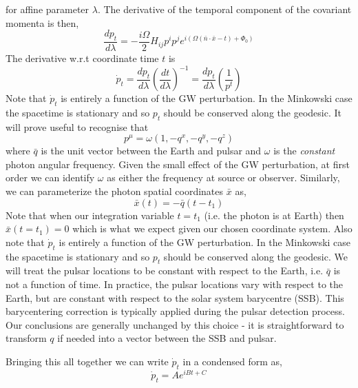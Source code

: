 \documentclass[fleqn,usenatbib,useAMS]{mnras}
\begin{document}
\noindent for affine parameter $\lambda$. The derivative of the temporal component of the covariant momenta is then,
\begin{equation}
	\frac{d p_{t}}{d \lambda} = -\frac{i\Omega}{2} H_{ij}p^i p^j  e^{i(\Omega(\bar{n}\cdot \bar{x} - t)+\Phi_0)}
\end{equation}
\noindent The derivative w.r.t coordinate time $t$ is
\begin{equation}
	\dot{p}_t = \frac{d p_{t}}{d \lambda} \left(\frac{dt}{d\lambda}\right)^{-1} = \frac{d p_{t}}{d \lambda} \left(\frac{1}{p^t}\right)
\end{equation}
\noindent Note that $\dot{p}_t$ is entirely a function of the GW perturbation. In the Minkowski case the spacetime is stationary and so $p_t$ should be conserved along the geodesic. 
It will prove useful to recognise that 
\begin{equation}
	p^{\mu} = \omega(1,-q^x,-q^y,-q^z)
\end{equation} 
where $\bar{q}$ is the unit vector between the Earth and pulsar and $\omega$ is the \textit{constant} photon angular frequency. Given the small effect of the GW perturbation, at first order we can identify $\omega$ as either the frequency at source or observer. Similarly, we can parameterize the photon spatial coordinates $\bar{x}$ as,
\begin{equation}
	\bar{x}(t) = - \bar{q} (t - t_1)
\end{equation} 
Note that when our integration variable $t = t_1$ (i.e. the photon is at Earth) then $\bar{x}(t=t_1) = 0$ which is what we expect given our chosen coordinate system. Also note that $\dot{p}_t$ is entirely a function of the GW perturbation. In the Minkowski case the spacetime is stationary and so $p_t$ should be conserved along the geodesic. We will treat the pulsar locations to be constant with respect to the Earth, i.e. $\bar{q}$ is not a function of time. In practice, the pulsar locations vary with respect to the Earth, but are constant with respect to the solar system barycentre (SSB). This barycentering correction is typically applied during the pulsar detection process. Our conclusions are generally unchanged by this choice - it is straightforward to transform $q$ if needed into a vector between the SSB and pulsar. \newline  


\noindent Bringing this all together we can write $\dot{p}_t$ in a condensed form as,
\begin{equation}
	\dot{p}_t = A e^{i B t + C}
\end{equation}
\end{document}
